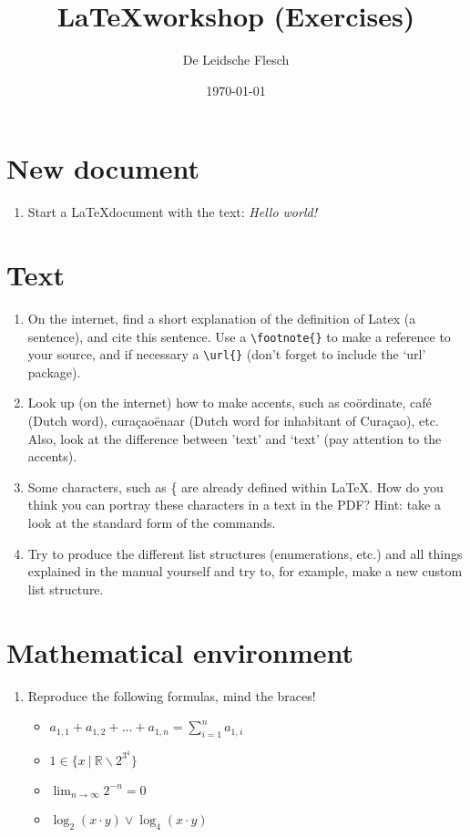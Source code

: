 \documentclass{article}
\begin{document}
\title{\LaTeX workshop (Exercises)}
\author{De Leidsche Flesch}
\date{\today}

\maketitle

\section{New document}
	\begin{enumerate}
		\item Start a \LaTeX document with the text: \emph{Hello world!}
	\end{enumerate}
	
\section{Text}
	\begin{enumerate}
		\item On the internet, find a short explanation of the definition of Latex (a sentence), and cite this sentence. Use a \verb+\footnote{}+ to make a reference to your source, and if necessary a \verb+\url{}+ (don't forget to include the `url' package).
		\item Look up (on the internet) how to make accents, such as co\"ordinate, caf\'e (Dutch word), cura\c{c}ao\"enaar (Dutch word for inhabitant of Cura\c{c}ao), etc. Also, look at the difference between 'text' and `text' (pay attention to the accents).
		\item Some characters, such as \{ are already defined within \LaTeX. How do you think you can portray these characters in a text in the PDF? Hint: take a look at the standard form of the commands.
		\item Try to produce the different list structures (enumerations, etc.) and all things explained in the manual yourself and try to, for example, make a new custom list structure.
	\end{enumerate}


\section{Mathematical environment}
\begin{enumerate}
	\item Reproduce the following formulas, mind the braces!
	\begin{itemize}
		\renewcommand{\labelitemi}{\(\circ\)}
			\item\(a_{1,1} + a_{1,2} + \ldots + a_{1,n} = \sum_{i = 1}^n a_{1,i}\)\\
			\item\( 1 \in \{ x~|~\mathbb{R} \backslash 2^{3^4} \}\)\\
			\item\(\lim_{n \to \infty} 2^{-n} = 0\)\\
			\item\(\log_2(x\cdot y) \lor \log_4(x\cdot y)\)
		\end{itemize}
		
\end{enumerate}
\end{document}
